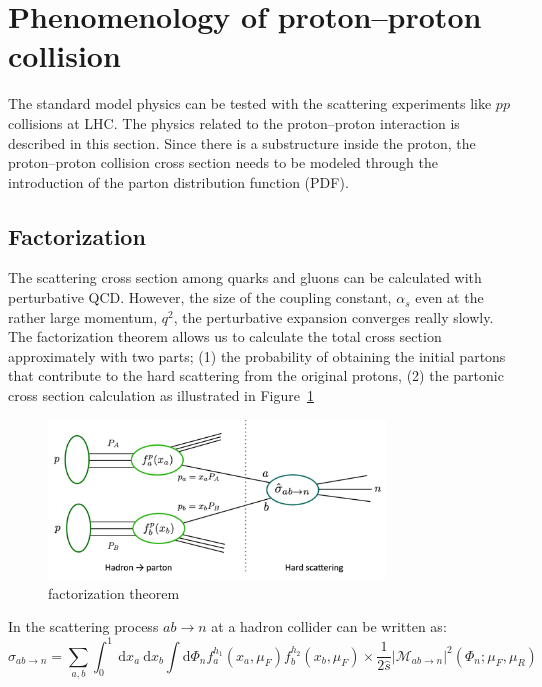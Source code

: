 \section{Phenomenology of proton--proton collision}
The standard model physics can be tested with the scattering experiments like $pp$ collisions at LHC.
The physics related to the proton--proton interaction is described in this section. 
Since there is a substructure inside the proton, the proton--proton collision cross section needs to be modeled through the introduction of the parton distribution function (PDF).

\subsection{Factorization}
\label{subsec:factorization}
The scattering cross section among quarks and gluons can be calculated with perturbative QCD. 
However, the size of the coupling constant, $\alpha_s$ even at the rather large momentum, $q^2$, the perturbative expansion converges really slowly.
The factorization theorem \cite{} allows us to calculate the total cross section approximately with two parts; 
(1) the probability of obtaining the initial partons that contribute to the hard scattering from the original protons, 
(2) the partonic cross section calculation as illustrated in Figure~\ref{fig:factorization}
\begin{figure}[tbp]
\begin{center}
 \includegraphics[width=0.8\textwidth,keepaspectratio]{figures/factorization}
\caption{
 factorization theorem 
}
\label{fig:factorization}
\end{center}
\end{figure}
In the scattering process $ab \rightarrow n$ at a hadron collider can be written as:
\begin{equation}
\label{eqn:qcdxsec}
\sigma_{a b \rightarrow n}=\sum_{a, b} \int_{0}^{1} \mathrm{~d} x_{a} \mathrm{~d} x_{b} \int \mathrm{d} \Phi_{n} f_{a}^{h_{1}}\left(x_{a}, \mu_{F}\right) f_{b}^{h_{2}}\left(x_{b}, \mu_{F}\right) \times \frac{1}{2 \hat{s}}\left|\mathcal{M}_{a b \rightarrow n}\right|^{2}\left(\Phi_{n} ; \mu_{F}, \mu_{R}\right)
\end{equation}
